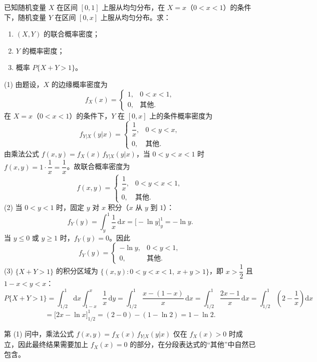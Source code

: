 \documentclass[lang=cn,11pt]{elegantbook}
\begin{document}
\begin{exercise}[条件均匀分布] \label{exer:3-14}
已知随机变量 $X$ 在区间 $[0,1]$ 上服从均匀分布，在 $X=x$（$0<x<1$）的条件下，随机变量 $Y$ 在区间 $[0,x]$ 上服从均匀分布。求：
\begin{enumerate}
    \item[(1)] $(X,Y)$ 的联合概率密度；
    \item[(2)] $Y$ 的概率密度；
    \item[(3)] 概率 $P\{X+Y>1\}$。
\end{enumerate}
\end{exercise}
\begin{solution}
(1) 由题设，$X$ 的边缘概率密度为
\[
f_X(x) = \begin{cases} 1, & 0 < x < 1, \\ 0, & \text{其他}. \end{cases}
\]
在 $X=x$（$0<x<1$）的条件下，$Y$ 在 $[0,x]$ 上的条件概率密度为
\[
f_{Y|X}(y|x) = \begin{cases} \dfrac{1}{x}, & 0 < y < x, \\ 0, & \text{其他}. \end{cases}
\]
由乘法公式 $f(x,y) = f_X(x)\,f_{Y|X}(y|x)$，当 $0<y<x<1$ 时 $f(x,y) = 1\cdot\dfrac{1}{x} = \dfrac{1}{x}$。故联合概率密度为
\[
f(x,y) = \begin{cases} \dfrac{1}{x}, & 0 < y < x < 1, \\ 0, & \text{其他}. \end{cases}
\]
(2) 当 $0<y<1$ 时，固定 $y$ 对 $x$ 积分（$x$ 从 $y$ 到 $1$）：
\[
f_Y(y) = \int_y^1\frac{1}{x}\,\mathrm{d}x = \bigl[-\ln y\bigr]_y^1 = -\ln y.
\]
当 $y \leqslant 0$ 或 $y \geqslant 1$ 时，$f_Y(y) = 0$。因此
\[
f_Y(y) = \begin{cases} -\ln y, & 0 < y < 1, \\ 0, & \text{其他}. \end{cases}
\]
(3) $\{X+Y>1\}$ 的积分区域为 $\{(x,y): 0<y<x<1,\ x+y>1\}$，即 $x>\dfrac{1}{2}$ 且 $1-x<y<x$：
\[
P\{X+Y>1\} = \int_{1/2}^1\mathrm{d}x\int_{1-x}^x\frac{1}{x}\,\mathrm{d}y = \int_{1/2}^1\frac{x-(1-x)}{x}\,\mathrm{d}x = \int_{1/2}^1\frac{2x-1}{x}\,\mathrm{d}x = \int_{1/2}^1\left(2-\frac{1}{x}\right)\mathrm{d}x
\]
\[
= \bigl[2x - \ln x\bigr]_{1/2}^1 = (2-0) - (1-\ln 2) = 1 - \ln 2.
\]
\end{solution}
\begin{note}
第 (1) 问中，乘法公式 $f(x,y) = f_X(x)\,f_{Y|X}(y|x)$ 仅在 $f_X(x)>0$ 时成立，因此最终结果需要加上 $f_X(x)=0$ 的部分，在分段表达式的``其他''中自然已包含。
\end{note}
\end{document}

